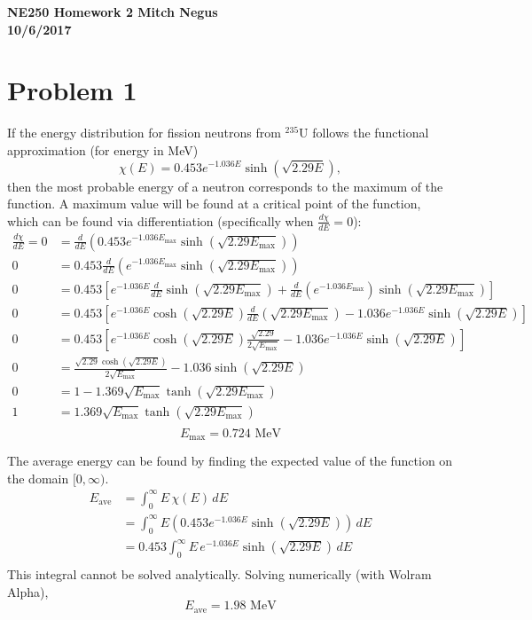 \documentclass{article}
\begin{document}
\thispagestyle{empty}

{\bf {\large {NE250 Homework {2} \hfill Mitch Negus\\
		\hspace*{\fill} 10/6/2017\\ }}}
		
		
		

\section*{Problem 1}

If the energy distribution for fission neutrons from $^{235}\text{U}$ follows the functional approximation (for energy in MeV)
$$ \chi(E) = 0.453e^{-1.036E}\sinh(\sqrt{2.29E}), $$
then the most probable energy of a neutron corresponds to the maximum of the function. A maximum value will be found at a critical point of the function, which can be found via differentiation (specifically when $\frac{d\chi}{dE} = 0$):
\begin{align*}
\frac{d\chi}{dE}= 0	&= \frac{d}{dE}\left(0.453e^{-1.036E_{\text{max}}}\sinh(\sqrt{2.29E_{\text{max}}})\right) \\
				  0	&= 0.453\frac{d}{dE}\left(e^{-1.036E_{\text{max}}}\sinh(\sqrt{2.29E_{\text{max}}})\right) \\
				  0	&= 0.453\left[e^{-1.036E}\frac{d}{dE}\sinh(\sqrt{2.29E_{\text{max}}})+\frac{d}{dE}\left(e^{-1.036E_{\text{max}}}\right)\sinh(\sqrt{2.29E_{\text{max}}})\right] \\
				  0	&= 0.453\left[e^{-1.036E}\cosh(\sqrt{2.29E})\frac{d}{dE}\left(\sqrt{2.29E_{\text{max}}}\right)-1.036e^{-1.036E}\sinh(\sqrt{2.29E})\right] \\
				  0	&= 0.453\left[e^{-1.036E}\cosh(\sqrt{2.29E})\frac{\sqrt{2.29}}{2\sqrt{E_{\text{max}}}}-1.036e^{-1.036E}\sinh(\sqrt{2.29E})\right] \\
				  0	&= \frac{\sqrt{2.29}\cosh(\sqrt{2.29E})}{2\sqrt{E_{\text{max}}}}-1.036\sinh(\sqrt{2.29E}) \\
				  0	&= 1 - 1.369\sqrt{E_{\text{max}}}\tanh(\sqrt{2.29E_{\text{max}}}) \\
				  1	&= 1.369\sqrt{E_{\text{max}}}\tanh(\sqrt{2.29E_{\text{max}}}) \\
\end{align*}
$$\boxed{ E_{\text{max}}= 0.724\text{ MeV} }$$

The average energy can be found by finding the expected value of the function on the domain $[0,\infty)$.
\begin{align*}
E_{\text{ave}}	&= \int_0^{\infty} E\,\chi(E)\,dE \\
				&= \int_0^{\infty} E\left(0.453e^{-1.036E}\sinh(\sqrt{2.29E})\right)\,dE \\
				&= 0.453\int_0^{\infty} E\,e^{-1.036E}\sinh(\sqrt{2.29E})\,dE \\
\end{align*}
This integral cannot be solved analytically. Solving numerically (with Wolram Alpha),
$$\boxed{ E_{\text{ave}} = 1.98\text{ MeV} }$$
\end{document}
